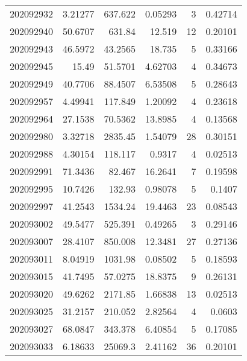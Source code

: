 \begin{tabular}{rrrrrr}
 202092932 &          3.21277 &      637.622  &            0.05293 &           3 & 0.42714 \\
 202092940 &         50.6707  &      631.84   &           12.519   &          12 & 0.20101 \\
 202092943 &         46.5972  &       43.2565 &           18.735   &           5 & 0.33166 \\
 202092945 &         15.49    &       51.5701 &            4.62703 &           4 & 0.34673 \\
 202092949 &         40.7706  &       88.4507 &            6.53508 &           5 & 0.28643 \\
 202092957 &          4.49941 &      117.849  &            1.20092 &           4 & 0.23618 \\
 202092964 &         27.1538  &       70.5362 &           13.8985  &           4 & 0.13568 \\
 202092980 &          3.32718 &     2835.45   &            1.54079 &          28 & 0.30151 \\
 202092988 &          4.30154 &      118.117  &            0.9317  &           4 & 0.02513 \\
 202092991 &         71.3436  &       82.467  &           16.2641  &           7 & 0.19598 \\
 202092995 &         10.7426  &      132.93   &            0.98078 &           5 & 0.1407  \\
 202092997 &         41.2543  &     1534.24   &           19.4463  &          23 & 0.08543 \\
 202093002 &         49.5477  &      525.391  &            0.49265 &           3 & 0.29146 \\
 202093007 &         28.4107  &      850.008  &           12.3481  &          27 & 0.27136 \\
 202093011 &          8.04919 &     1031.98   &            0.08502 &           5 & 0.18593 \\
 202093015 &         41.7495  &       57.0275 &           18.8375  &           9 & 0.26131 \\
 202093020 &         49.6262  &     2171.85   &            1.66838 &          13 & 0.02513 \\
 202093025 &         31.2157  &      210.052  &            2.82564 &           4 & 0.0603  \\
 202093027 &         68.0847  &      343.378  &            6.40854 &           5 & 0.17085 \\
 202093033 &          6.18633 &    25069.3    &            2.41162 &          36 & 0.20101 \\

\end{tabular}

